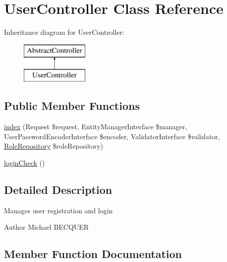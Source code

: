 \hypertarget{class_app_1_1_controller_1_1_user_controller}{}\section{User\+Controller Class Reference}
\label{class_app_1_1_controller_1_1_user_controller}
Inheritance diagram for User\+Controller\+:\begin{figure}[H]
\begin{center}
\leavevmode
\includegraphics[height=2.000000cm]{class_app_1_1_controller_1_1_user_controller}
\end{center}
\end{figure}
\subsection*{Public Member Functions}
\begin{DoxyCompactItemize}
\item 
\mbox{\hyperlink{class_app_1_1_controller_1_1_user_controller_a18d2b8ef36c20c54ff76c6ce68534409}{index}} (Request \$request, Entity\+Manager\+Interface \$manager, User\+Password\+Encoder\+Interface \$encoder, Validator\+Interface \$validator, \mbox{\hyperlink{class_app_1_1_repository_1_1_role_repository}{Role\+Repository}} \$role\+Repository)
\item 
\mbox{\hyperlink{class_app_1_1_controller_1_1_user_controller_affba077e60f5a9a813c6880603500ec5}{login\+Check}} ()
\end{DoxyCompactItemize}


\subsection{Detailed Description}
Manages user registration and login \begin{DoxyAuthor}{Author}
Michael B\+E\+C\+Q\+U\+ER 
\end{DoxyAuthor}


\subsection{Member Function Documentation}
\mbox{\label{class_app_1_1_controller_1_1_user_controller_a18d2b8ef36c20c54ff76c6ce68534409}} 
